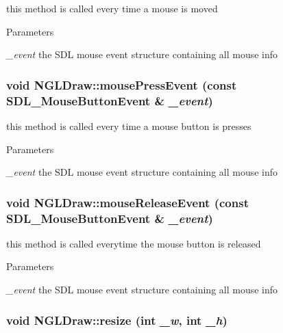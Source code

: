 this method is called every time a mouse is moved 
\begin{DoxyParams}{Parameters}
\item[{\em \_\-event}]the SDL mouse event structure containing all mouse info \end{DoxyParams}
\hypertarget{classNGLDraw_a1b20896f4aac3cddd5ea2f977410a19f}{
\subsubsection[{mousePressEvent}]{\setlength{\rightskip}{0pt plus 5cm}void NGLDraw::mousePressEvent (const SDL\_\-MouseButtonEvent \& {\em \_\-event})}}
\label{classNGLDraw_a1b20896f4aac3cddd5ea2f977410a19f}


this method is called every time a mouse button is presses 
\begin{DoxyParams}{Parameters}
\item[{\em \_\-event}]the SDL mouse event structure containing all mouse info \end{DoxyParams}
\hypertarget{classNGLDraw_aa41eba2e6fd12011cdd62a7db8f7f84e}{
\subsubsection[{mouseReleaseEvent}]{\setlength{\rightskip}{0pt plus 5cm}void NGLDraw::mouseReleaseEvent (const SDL\_\-MouseButtonEvent \& {\em \_\-event})}}
\label{classNGLDraw_aa41eba2e6fd12011cdd62a7db8f7f84e}


this method is called everytime the mouse button is released 
\begin{DoxyParams}{Parameters}
\item[{\em \_\-event}]the SDL mouse event structure containing all mouse info \end{DoxyParams}
\hypertarget{classNGLDraw_ae5151dc189fd5de5649b72c5e76bcf47}{
\subsubsection[{resize}]{\setlength{\rightskip}{0pt plus 5cm}void NGLDraw::resize (int {\em \_\-w}, \/  int {\em \_\-h})}}
\label{classNGLDraw_ae5151dc189fd5de5649b72c5e76bcf47}



